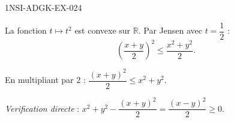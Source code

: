 \begin{corrige}{1NSI-ADGK-EX-024}

La fonction $t \mapsto t^2$ est convexe sur $\mathbb{R}$. Par Jensen avec $t = \dfrac{1}{2}$ :
\[ \left(\frac{x+y}{2}\right)^2 \leq \frac{x^2 + y^2}{2}. \]


En multipliant par $2$ : $\dfrac{(x+y)^2}{2} \leq x^2 + y^2$.

\emph{Verification directe} : $x^2 + y^2 - \dfrac{(x+y)^2}{2} = \dfrac{(x-y)^2}{2} \geq 0$.

\end{corrige}
